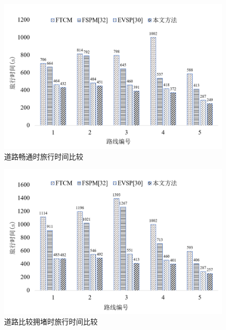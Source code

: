 \begin{figure}[H]
	\centering
	\includegraphics[width=\linewidth]{figures/travel_time1.png}
	\caption{道路畅通时旅行时间比较}
	\label{fig:travel_time_smooth}
\end{figure}


\begin{figure}[H]
	\centering
	\includegraphics[width=\linewidth]{figures/travel_time2.png}
	\caption{道路比较拥堵时旅行时间比较}
	\label{fig:travel_time_relatively_congestion}
\end{figure}


